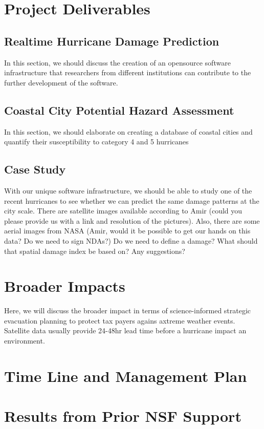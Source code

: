 \documentclass{proposalnsf}
\begin{document}
\section{Project Deliverables}
\subsection{Realtime Hurricane Damage Prediction} In this section, we should discuss the creation of an opensource software infrastructure that researchers from different institutions can contribute to the further development of the software. 

\subsection{Coastal City Potential Hazard Assessment} In this section, we should elaborate on creating a database of coastal cities and quantify their susceptibility to category 4 and 5 hurricanes

\subsection{Case Study} With our unique software infrastructure, we should be able to study one of the recent hurricanes to see whether we can predict the same damage patterns at the city scale. There are satellite images available according to Amir (could you please provide us with a link and resolution of the pictures). Also, there are some aerial images from NASA (Amir, would it be possible to get our hands on this data? Do we need to sign NDAs?) Do we need to define a damage? What should that spatial damage index be based on? Any suggestions?

\section{Broader Impacts}
Here, we will discuss the broader impact in terms of science-informed strategic evacuation planning to protect tax payers agains axtreme weather events. Satellite data usually provide 24-48hr lead time before a hurricane impact an environment.

\section{Time Line and Management Plan}

\section{Results from Prior NSF Support}

\renewcommand{\thepage} {D--\arabic{page}}




\newpage
{}
\renewcommand{\thepage} {G--\arabic{page}}
\end{document}
